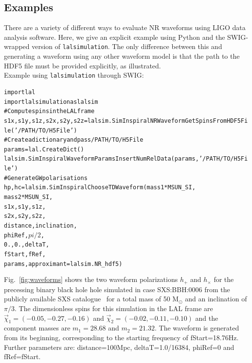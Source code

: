 \documentclass[11pt,tightenlines,article,amssymb,amsmath,amsfonts,superscriptaddress,nofootinbib]{revtex4}
\begin{document}
\subsection{Examples}
There are a variety of different ways to evaluate NR waveforms using LIGO data analysis software. Here, we give an explicit example
using Python and the SWIG-wrapped version of \texttt{lalsimulation}.
The only difference between this and generating a waveform using any other
waveform model is that the path to the HDF5 file must be provided explicitly,
as illustrated. \\
Example using \texttt{lalsimulation} through SWIG:
\begin{alltt}
import lal
import lalsimulation as lalsim
# Compute spins in the LAL frame
s1x, s1y, s1z, s2x, s2y, s2z = \newline lalsim.SimInspiralNRWaveformGetSpinsFromHDF5File('/PATH/TO/H5File')
# Create a dictionary and pass /PATH/TO/H5File
params = lal.CreateDict()
lalsim.SimInspiralWaveformParamsInsertNumRelData(params, '/PATH/TO/H5File')
# Generate GW polarisations 
hp, hc = lalsim.SimInspiralChooseTDWaveform(mass1 * MSUN_SI, 
	              mass2 * MSUN_SI,
              s1x, s1y, s1z,
              s2x, s2y, s2z, 
              distance, inclination,
              phiRef, $pi/2$,
              0., 0., deltaT, 
              fStart, fRef,
              params, approximant=lalsim.NR_hdf5)
\end{alltt}
Fig.~\ref{fig:waveforms} shows the two waveform polarizations $h_+$ and $h_{\times}$ for the precessing binary black hole hole simulated in case 
SXS:BBH:0006 from the publicly available SXS catalogue~\cite{Mroue:2013xna} for a total mass of 50 $\mathrm{M}_\odot$ and an inclination of $\pi/3$. The dimensionless spins for this simulation in the LAL frame are 
$\vec{\chi}_1=(-0.05, -0.27, -0.16)$ and $\vec{\chi}_2=(-0.02, -0.11, -0.10)$ and the component masses are $m_1=28.68$ and $m_2=21.32$. The waveform is generated from its beginning, corresponding to the starting frequency of fStart=18.76Hz.
Further parameters are: distance=100Mpc, deltaT=1.0/16384, phiRef=0 and fRef=fStart.
\end{document}
